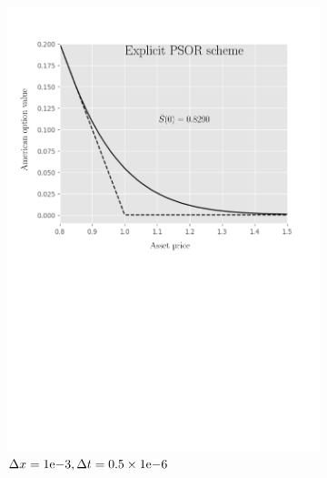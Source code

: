 \begin{figure}[H]
\begin{subfigure}{0.4\textwidth}
    \includegraphics[width=\textwidth]{chapters/chapter5/TestCase4ExplicitLCP.pdf}
    \caption{$\Delta{x}={1}\mathrm{e}{-3}, \Delta{t}=0.5\times{1}\mathrm{e}{-6}$}
    \label{fig:lcp:numericaresults:test_case_4_explicit}
  \end{subfigure}
  \begin{subfigure}{0.4\textwidth}
    \centering

\end{subfigure}
\end{figure}
